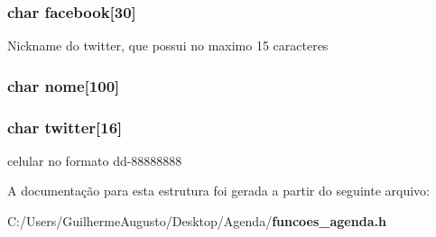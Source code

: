 \subsubsection[{facebook}]{\setlength{\rightskip}{0pt plus 5cm}char facebook[30]}\label{structs__contato_a133ac04c7e6b432f9d77af34f7545dfd}
Nickname do twitter, que possui no maximo 15 caracteres 
\subsubsection[{nome}]{\setlength{\rightskip}{0pt plus 5cm}char nome[100]}\label{structs__contato_aa4e90ca99702bac9e1c78503ad86acba}
\subsubsection[{twitter}]{\setlength{\rightskip}{0pt plus 5cm}char twitter[16]}\label{structs__contato_aeb136f7c9610023044395e61ed27adc1}
celular no formato dd-\/88888888 

A documentação para esta estrutura foi gerada a partir do seguinte arquivo\+:\begin{DoxyCompactItemize}
\item 
C\+:/\+Users/\+Guilherme\+Augusto/\+Desktop/\+Agenda/{\bf funcoes\+\_\+agenda.\+h}\end{DoxyCompactItemize}
